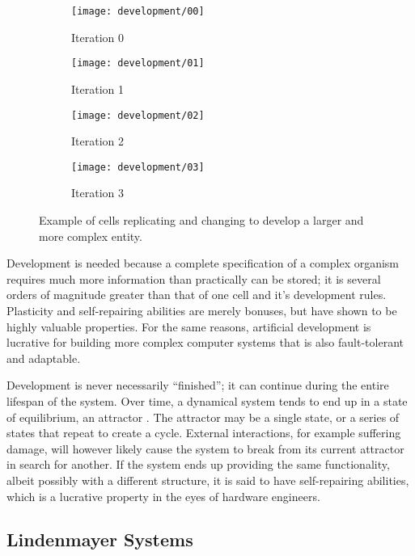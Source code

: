 \begin{figure}[!ht]
    \centering
    \begin{subfigure}{0.24\textwidth}
        \centering
        \texttt{[image: development/00]}
        \caption{Iteration 0}
    \end{subfigure}
    \begin{subfigure}{0.24\textwidth}
        \centering
        \texttt{[image: development/01]}
        \caption{Iteration 1}
    \end{subfigure}
    \begin{subfigure}{0.24\textwidth}
        \centering
        \texttt{[image: development/02]}
        \caption{Iteration 2}
    \end{subfigure}
    \begin{subfigure}{0.24\textwidth}
        \centering
        \texttt{[image: development/03]}
        \caption{Iteration 3}
    \end{subfigure}
    \caption[Development]{
        Example of cells replicating and changing to develop a larger and more complex entity.
    }
    \label{fig:development}
\end{figure}

Development is needed because a complete specification of a complex organism requires much more information than practically can be stored; it is several orders of magnitude greater than that of one cell and it's development rules.
Plasticity and self-repairing abilities are merely bonuses, but have shown to be highly valuable properties.
For the same reasons, artificial development is lucrative for building more complex computer systems that is also fault-tolerant and adaptable.

Development is never necessarily ``finished''; it can continue during the entire lifespan of the system.
Over time, a dynamical system tends to end up in a state of equilibrium, an attractor \cite{heylighen2001selforg}.
The attractor may be a single state, or a series of states that repeat to create a cycle.
External interactions, for example suffering damage, will however likely cause the system to break from its current attractor in search for another.
If the system ends up providing the same functionality, albeit possibly with a different structure, it is said to have self-repairing abilities, which is a lucrative property in the eyes of hardware engineers.

\subsection{Lindenmayer Systems}

